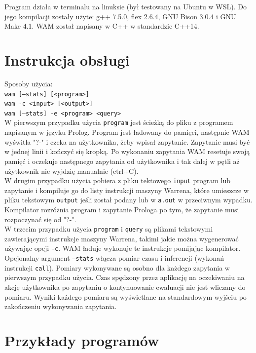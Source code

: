 Program działa w terminalu na linuksie (był testowany na Ubuntu w WSL). Do jego kompilacji zostały użyte: g++ 7.5.0, flex 2.6.4, GNU Bison 3.0.4 i GNU Make 4.1. WAM został napisany w C++ w standardzie C++14.\\

\section{Instrukcja obsługi}

Sposoby użycia:\\
\texttt{wam [--stats] [<program>]}\\
\texttt{wam -c <input> [<output>]}\\
\texttt{wam [--stats] -e <program> <query>}\\

W pierwszym przypadku użycia \texttt{program} jest ścieżką do pliku z programem napisanym w języku Prolog. Program jest ładowany do pamięci, następnie WAM wyświtla "?-" i czeka na użytkownika, żeby wpisał zapytanie. Zapytanie musi być w jednej linii i kończyć się kropką. Po wykonaniu zapytania WAM resetuje swoją pamięć i oczekuje następnego zapytania od użytkownika i tak dalej w pętli aż użytkownik nie wyjdzię manualnie (ctrl+C).\\
W drugim przypadku użycia pobiera z pliku tektowego \texttt{input} program lub zapytanie i kompiluje go do listy instrukcji maszyny Warrena, które umieszcze w pliku tekstowym \texttt{output} jeśli został podany lub w \texttt{a.out} w przeciwnym wypadku. Kompilator rozróżnia program i zapytanie Prologa po tym, że zapytanie musi rozpoczynać się od "?-".\\
W trzecim przypadku użycia \texttt{program} i \texttt{query} są plikami tekstowymi zawierającymi instrukcje maszyny Warrena, takimi jakie można wygenerować używając opcji \texttt{-c}. WAM ładuje wykonuje te instrukcje pomijając kompilator.\\
Opcjonalny argument \texttt{--stats} włącza pomiar czasu i inferencji (wykonań instrukcji \texttt{call}). Pomiary wykonywane są osobno dla każdego zapytania w pierwszym przypadku użycia. Czas spędzony przez aplikację na oczekiwaniu na akcję użytkownika po zapytaniu o kontynuowanie ewaluacji nie jest wliczany do pomiaru. Wyniki każdego pomiaru są wyświetlane na standardowym wyjściu po zakończeniu wykonywania zapytania.\\

\section{Przykłady programów}

